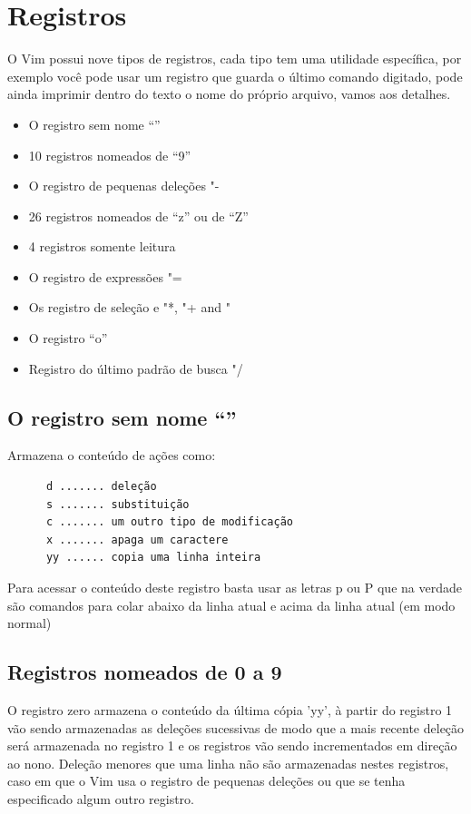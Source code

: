 \documentclass[10pt,a4paper,openany]{book}
\begin{document}
\chapter{Registros}
\label{Registros}

O Vim possui nove tipos de registros, cada tipo tem uma utilidade
específica, por exemplo você pode usar um registro que guarda o último
comando digitado, pode ainda imprimir dentro do texto o nome do
próprio arquivo, vamos aos detalhes.

\begin{itemize}
	\item O registro sem nome ``''
	\item 10 registros nomeados de ``9''
	\item O registro de pequenas deleções "-
	\item 26 registros nomeados de ``z'' ou de ``Z''
	\item 4 registros somente leitura
	\item O registro de expressões "=
	\item Os registro de seleção e  "*, "+ and "~
	\item O registro ``o''
	\item Registro do último padrão de busca "/
\end{itemize}

\section{O registro sem nome ``''}
\label{O registro sem nome ``''}

Armazena o conteúdo de ações como:

\begin{verbatim}
	  d ....... deleção
	  s ....... substituição
	  c ....... um outro tipo de modificação
	  x ....... apaga um caractere
	  yy ...... copia uma linha inteira
\end{verbatim}

Para acessar o conteúdo deste registro basta usar as letras p ou P que
na verdade são comandos para colar abaixo da linha atual e acima da
linha atual (em modo normal)

\section{Registros nomeados de 0 a 9}
\label{Registros nomeados de 0 a 9}

O registro zero armazena o conteúdo da última cópia 'yy', à partir do
registro 1 vão sendo armazenadas as deleções sucessivas de modo que a
mais recente deleção será armazenada no registro 1 e os registros vão
sendo incrementados em direção ao nono.  Deleção menores que uma linha
não são armazenadas nestes registros, caso em que o Vim usa o registro
de pequenas deleções ou que se tenha especificado algum outro
registro.
\end{document}
